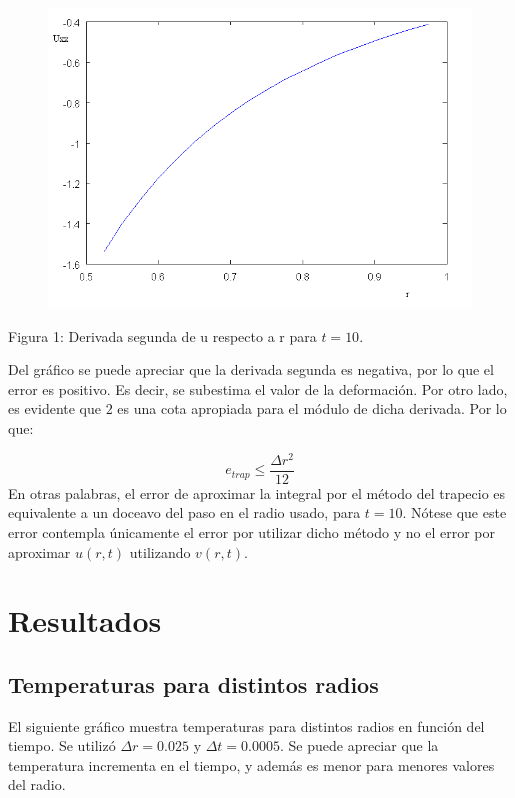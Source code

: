 ﻿\documentclass[%
final,
%
reprint,
%
notitlepage,
narroweqnarray,
inline,
twoside,
invited
]{ieee}
\begin{document}
\begin{figure}[H]
	\begin{center}
	\includegraphics[scale=0.5]{./img/uxx.png}
	\end{center}
\end{figure}
\begin{center}
\par Figura 1: Derivada segunda de u respecto a r para $t=10$.
\end{center}

Del gráfico se puede apreciar que la derivada segunda es negativa, por lo que el error es positivo. Es decir, 
se subestima el valor de la deformación. Por otro lado, es evidente que $2$ es una cota apropiada para el 
módulo de dicha derivada. Por lo que:

\[
e_{trap} \leq \frac{\Delta r^2}{12}
\]
En otras palabras, el error de aproximar la integral por el método del trapecio es equivalente a un doceavo 
del paso en el radio usado, para $t=10$. Nótese que este error contempla únicamente el error por utilizar 
dicho método y no el error por aproximar $u(r,t)$ utilizando $v(r,t)$.

\section{Resultados}

\subsection{Temperaturas para distintos radios}

El siguiente gráfico muestra temperaturas para distintos radios en función del tiempo. Se utilizó $\Delta r = 0.025$ 
y $\Delta t = 0.0005$. Se puede apreciar que la temperatura incrementa en el tiempo, y además es menor 
para menores valores del radio.
\end{document}
